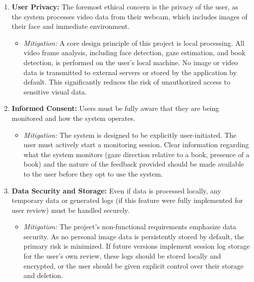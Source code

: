 \begin{enumerate}
    \item \textbf{User Privacy:} The foremost ethical concern is the privacy of the user, as the system processes video data from their webcam, which includes images of their face and immediate environment.
    \begin{itemize}
        \item \textit{Mitigation:} A core design principle of this project is local processing. All video frame analysis, including face detection, gaze estimation, and book detection, is performed on the user's local machine. No image or video data is transmitted to external servers or stored by the application by default. This significantly reduces the risk of unauthorized access to sensitive visual data.
    \end{itemize}

    \item \textbf{Informed Consent:} Users must be fully aware that they are being monitored and how the system operates.
    \begin{itemize}
        \item \textit{Mitigation:} The system is designed to be explicitly user-initiated. The user must actively start a monitoring session. Clear information regarding what the system monitors (gaze direction relative to a book, presence of a book) and the nature of the feedback provided should be made available to the user before they opt to use the system.
    \end{itemize}

    \item \textbf{Data Security and Storage:} Even if data is processed locally, any temporary data or generated logs (if this feature were fully implemented for user review) must be handled securely.
    \begin{itemize}
        \item \textit{Mitigation:} The project's non-functional requirements emphasize data security. As no personal image data is persistently stored by default, the primary risk is minimized. If future versions implement session log storage for the user's own review, these logs should be stored locally and encrypted, or the user should be given explicit control over their storage and deletion.
    \end{itemize}


\end{enumerate}
